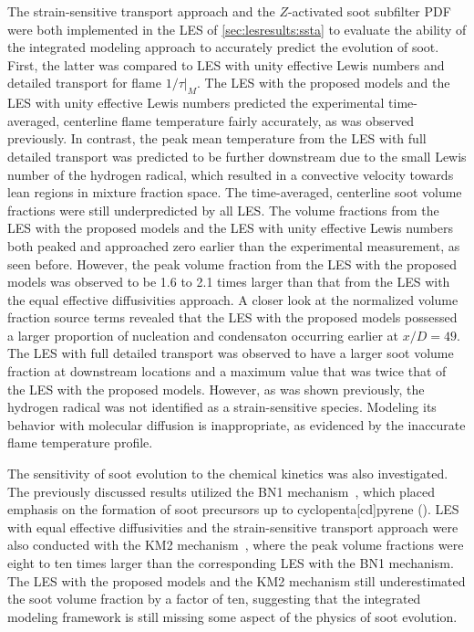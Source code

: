 The strain-sensitive transport approach and the $Z$-activated soot subfilter PDF were both implemented in the LES of \cref{sec:lesresults:ssta} to evaluate the ability of the integrated modeling approach to accurately predict the evolution of soot. First, the latter was compared to LES with unity effective Lewis numbers and detailed transport for flame $1/\tau|_M$. The LES with the proposed models and the LES with unity effective Lewis numbers predicted the experimental time-averaged, centerline flame temperature fairly accurately, as was observed previously. In contrast, the peak mean temperature from the LES with full detailed transport was predicted to be further downstream due to the small Lewis number of the hydrogen radical, which resulted in a convective velocity towards lean regions in mixture fraction space. The time-averaged, centerline soot volume fractions were still underpredicted by all LES. The volume fractions from the LES with the proposed models and the LES with unity effective Lewis numbers both peaked and approached zero earlier than the experimental measurement, as seen before. However, the peak volume fraction from the LES with the proposed models was observed to be 1.6 to 2.1 times larger than that from the LES with the equal effective diffusivities approach. A closer look at the normalized volume fraction source terms revealed that the LES with the proposed models possessed a larger proportion of nucleation and condensaton occurring earlier at $x/D = 49$. The LES with full detailed transport was observed to have a larger soot volume fraction at downstream locations and a maximum value that was twice that of the LES with the proposed models. However, as was shown previously, the hydrogen radical was not identified as a strain-sensitive species. Modeling its behavior with molecular diffusion is inappropriate, as evidenced by the inaccurate flame temperature profile. %

The sensitivity of soot evolution to the chemical kinetics was also investigated. The previously discussed results utilized the BN1 mechanism~\cite{blanquart2009,narayanaswamy2010}, which placed emphasis on the formation of soot precursors up to cyclopenta[cd]pyrene (). LES with equal effective diffusivities and the strain-sensitive transport approach were also conducted with the KM2 mechanism~\cite{wang2013}, where the peak volume fractions were eight to ten times larger than the corresponding LES with the BN1 mechanism. The LES with the proposed models and the KM2 mechanism still underestimated the soot volume fraction by a factor of ten, suggesting that the integrated modeling framework is still missing some aspect of the physics of soot evolution.

